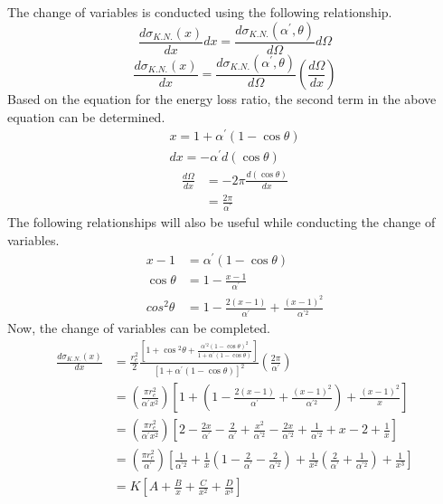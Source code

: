 The change of variables is conducted using the following relationship.
\begin{equation*}
  \frac{d\sigma_{K.N.}(x)}{dx} dx = 
  \frac{d\sigma_{K.N.}(\alpha^{'},\theta)}{d\Omega} d\Omega
\end{equation*}
\begin{equation*}
  \frac{d\sigma_{K.N.}(x)}{dx} = 
  \frac{d\sigma_{K.N.}(\alpha^{'},\theta)}{d\Omega}
  \left(\frac{d\Omega}{dx}\right)
\end{equation*}
Based on the equation for the energy loss ratio, the second term in the above
equation can be determined.
\begin{align}
  x = 1 + \alpha^{'}(1-\cos{\theta}) \nonumber \\
  dx = -\alpha^{'} d(\cos{\theta}) \nonumber
\end{align}
\begin{align}
  \frac{d\Omega}{dx} & = -2\pi\frac{d(\cos{\theta})}{dx} \nonumber \\
  & = \frac{2\pi}{\alpha^{'}}
\end{align}
The following relationships will also be useful while conducting the change
of variables.
\begin{align}
  x - 1 & = \alpha^{'}(1-\cos{\theta}) \\
  \cos{\theta} & = 1 - \frac{x - 1}{\alpha^{'}} \nonumber \\
  cos^2\theta & = 1 - \frac{2(x-1)}{\alpha^{'}} + \frac{(x-1)^2}{\alpha^{'2}}
\end{align}
Now, the change of variables can be completed.
\begin{align}
  \frac{d\sigma_{K.N.}(x)}{dx} & = \frac{r_e^2}{2}
  \frac{\left[1 + \cos{^{2}\theta} + \frac{\alpha^{'2}(1-\cos{\theta})^2}
                                  {1 + \alpha^{'}(1-\cos{\theta})}\right] }
  {\left[1 + \alpha^{'}(1-\cos{\theta}) \right]^2} 
  \left(\frac{2\pi}{\alpha^{'}}\right) \nonumber \\
  & = \left(\frac{\pi r_e^2}{\alpha^{'}x^2}\right)
  \left[1 + 
    \left(1 - \frac{2(x-1)}{\alpha^{'}} + \frac{(x-1)^2}{\alpha^{'2}}\right) +
    \frac{(x-1)^2}{x} \right] \nonumber \\
  & = \left(\frac{\pi r_e^2}{\alpha^{'}x^2}\right) \left[2 - 
    \frac{2x}{\alpha^{'}} - \frac{2}{\alpha^{'}} +\frac{x^2}{\alpha^{'2}} -
    \frac{2x}{\alpha^{'2}} + \frac{1}{\alpha^{'2}} + x - 2 + \frac{1}{x} \right]
  \nonumber \\
  & = \left(\frac{\pi r_e^2}{\alpha^{'}}\right) \left[ \frac{1}{\alpha^{'2}} +
    \frac{1}{x}\left(1 - \frac{2}{\alpha^{'}}-\frac{2}{\alpha^{'2}}\right) +
    \frac{1}{x^2}\left(\frac{2}{\alpha^{'}} + \frac{1}{\alpha^{'2}}\right) +
    \frac{1}{x^3} \right] \nonumber \\
  & = K \left[A + \frac{B}{x} + \frac{C}{x^2} + \frac{D}{x^3}\right]
\end{align}

